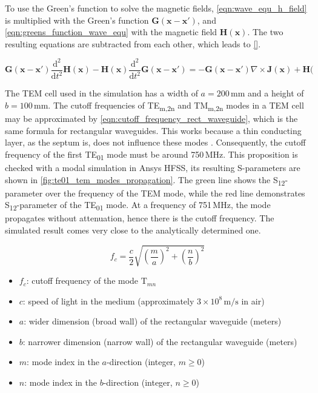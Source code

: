 To use the Green's function to solve the magnetic fields, \autoref{eqn:wave_equ_h_field} is multiplied with the Green's function $\mathbf{G}(\mathbf{x}-\mathbf{x'})$, and \autoref{eqn:greens_function_wave_equ} with the magnetic field $\mathbf{H}(\mathbf{x})$. The two resulting equations are subtracted from each other, which leads to \autoref{}.

\begin{equation}
    \mathbf{G}(\mathbf{x}-\mathbf{x'})\frac{\mathrm{d^2}}{\mathrm{d}t^2}\mathbf{H}(\mathbf{x})-\mathbf{H}(\mathbf{x})\frac{\mathrm{d^2}}{\mathrm{d}t^2}\mathbf{G}(\mathbf{x}-\mathbf{x'})=-\mathbf{G}(\mathbf{x}-\mathbf{x'})\nabla\times\mathbf{J}(\mathbf{x})+\mathbf{H}(
\end{equation}


The TEM cell used in the simulation has a width of $a=200\,\mathrm{mm}$ and a height of $b=100\,\mathrm{mm}$. The cutoff frequencies of TE\textsubscript{m,2n} and TM\textsubscript{m,2n} modes in a TEM cell may be approximated by \autoref{eqn:cutoff_frequency_rect_waveguide}, which is the same formula for rectangular waveguides. This works because a thin conducting layer, as the septum is, does not influence these modes \cite{Weil_Gruner_1984}. Consequently, the cutoff frequency of the first TE\textsubscript{01} mode must be around 750\,MHz. This proposition is checked with a modal simulation in Ansys HFSS, its resulting S-parameters are shown in \autoref{fig:te01_tem_modes_propagation}. The green line shows the S\textsubscript{12}-parameter over the frequency of the TEM mode, while the red line demonstrates S\textsubscript{12}-parameter of the TE\textsubscript{01} mode. At a frequency of 751\,MHz, the mode propagates without attenuation, hence there is the cutoff frequency. The simulated result comes very close to the analytically determined one.

\begin{equation}
    f_c = \frac{c}{2} \sqrt{\left(\frac{m}{a}\right)^2 + \left(\frac{n}{b}\right)^2}
    \label{eqn:cutoff_frequency_rect_waveguide}
\end{equation}

\begin{itemize}
  \item \( f_c \): cutoff frequency of the mode \(\text{T}_{mn}\)
  \item \( c \): speed of light in the medium (approximately \(3 \times 10^8 \, \text{m/s}\) in air)
  \item \( a \): wider dimension (broad wall) of the rectangular waveguide (meters)
  \item \( b \): narrower dimension (narrow wall) of the rectangular waveguide (meters)
  \item \( m \): mode index in the \(a\)-direction (integer, \(m \geq 0\))
  \item \( n \): mode index in the \(b\)-direction (integer, \(n \geq 0\))
\end{itemize}

